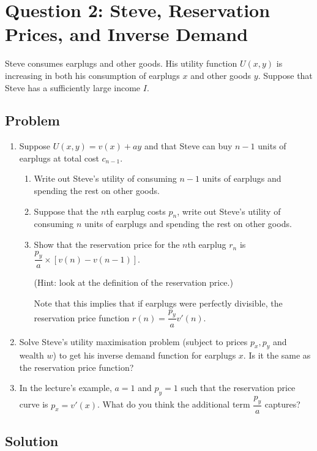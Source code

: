 \documentclass[12pt]{article}
\begin{document}
\section{Question 2: Steve, Reservation Prices, and Inverse Demand}

\noindent
Steve consumes earplugs and other goods. His utility function \(U(x,y)\) is increasing in both his consumption of earplugs \(x\) and other goods \(y\). Suppose that Steve has a sufficiently large income \(I\).

\subsection{Problem}
\begin{enumerate}[label=(\alph*)]
    \item Suppose \(U(x,y)=v(x)+ay\) and that Steve can buy \(n-1\) units of earplugs at total cost \(c_{n-1}\).
    \begin{enumerate}[label=(\roman*)]
        \item Write out Steve’s utility of consuming \(n-1\) units of earplugs and spending the rest on other goods.
        \item Suppose that the \(n\)th earplug costs \(p_n\), write out Steve’s utility of consuming \(n\) units of earplugs and spending the rest on other goods.
        \item Show that the reservation price for the \(n\)th earplug \(r_n\) is \(\dfrac{p_y}{a}\times [v(n)-v(n-1)]\).

        (Hint: look at the definition of the reservation price.)

        Note that this implies that if earplugs were perfectly divisible, the reservation price function \(r(n)=\dfrac{p_y}{a}v'(n)\).
    \end{enumerate}
    \item Solve Steve’s utility maximisation problem (subject to prices \(p_x,p_y\) and wealth \(w\)) to get his inverse demand function for earplugs \(x\). Is it the same as the reservation price function?
    \item In the lecture’s example, \(a=1\) and \(p_y=1\) such that the reservation price curve is \(p_x=v'(x)\). What do you think the additional term \(\dfrac{p_y}{a}\) captures?
\end{enumerate}

\newpage
\subsection{Solution}
\end{document}
